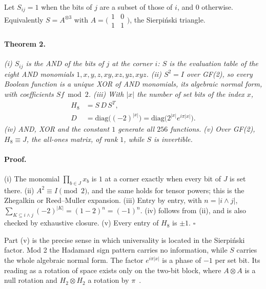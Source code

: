\documentclass[twocolumn]{iopjournal}
\begin{document}
Let $S_{ij} = 1$ when the bits of $j$ are a subset of those of $i$,
and $0$ otherwise. Equivalently $S = A^{\otimes 3}$ with
$A = \bigl(\begin{smallmatrix}1&0\\1&1\end{smallmatrix}\bigr)$, the
Sierpi\'nski triangle.

\paragraph{Theorem 2.} \textit{(i) $S_{ij}$ is the AND of the bits of
$j$ at the corner $i$: $S$ is the evaluation table of the eight AND
monomials $1, x, y, z, xy, xz, yz, xyz$. (ii) $S^2 = I$ over GF(2), so
every Boolean function is a unique XOR of AND monomials, its algebraic
normal form, with coefficients $S f \bmod 2$. (iii) With $|x|$ the
number of set bits of the index $x$,}
\begin{equation}
\begin{aligned}
  H_8 &= S\,D\,S^T, \\
  D &= \mathrm{diag}\big((-2)^{|x|}\big) = \mathrm{diag}\big(2^{|x|}e^{i\pi|x|}\big).
\end{aligned}
\end{equation}
\textit{(iv) AND, XOR and the constant $1$ generate all $256$
functions. (v) Over GF(2), $H_8 \equiv J$, the all-ones matrix, of
rank $1$, while $S$ is invertible.}

\paragraph{Proof.} (i) The monomial $\prod_{b \in J} x_b$ is $1$ at a
corner exactly when every bit of $J$ is set there. (ii)
$A^2 \equiv I \pmod 2$, and the same holds for tensor powers; this is
the Zhegalkin or Reed--Muller expansion. (iii) Entry by entry, with
$n = |i \wedge j|$,
$\sum_{K \subseteq i \wedge j} (-2)^{|K|} = (1 - 2)^n = (-1)^n$.
(iv) follows from (ii), and is also checked by exhaustive closure.
(v) Every entry of $H_8$ is $\pm1$. \hfill $\square$

\medskip
\noindent
Part (v) is the precise sense in which universality is located in the
Sierpi\'nski factor. Mod 2 the Hadamard sign pattern carries no
information, while $S$ carries the whole algebraic normal form. The
factor $e^{i\pi|x|}$ is a phase of $-1$ per set bit. Its reading as a
rotation of space exists only on the two-bit block, where $A \otimes A$
is a null rotation and $H_2 \otimes H_2$ a rotation by
$\pi$~\cite{NelsonNullRot}.
\end{document}
